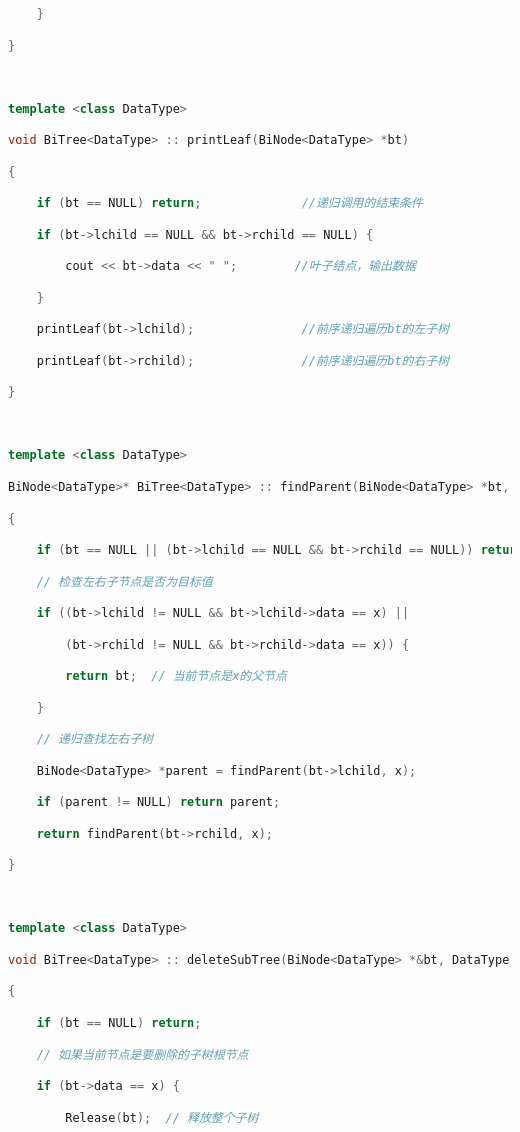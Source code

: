 \begin{lstlisting}[language=C++]
    }

}

  

template <class DataType>

void BiTree<DataType> :: printLeaf(BiNode<DataType> *bt)

{

    if (bt == NULL) return;              //递归调用的结束条件

    if (bt->lchild == NULL && bt->rchild == NULL) {

        cout << bt->data << " ";        //叶子结点，输出数据

    }

    printLeaf(bt->lchild);               //前序递归遍历bt的左子树

    printLeaf(bt->rchild);               //前序递归遍历bt的右子树

}

  

template <class DataType>

BiNode<DataType>* BiTree<DataType> :: findParent(BiNode<DataType> *bt, DataType x)

{

    if (bt == NULL || (bt->lchild == NULL && bt->rchild == NULL)) return NULL;

    // 检查左右子节点是否为目标值

    if ((bt->lchild != NULL && bt->lchild->data == x) ||

        (bt->rchild != NULL && bt->rchild->data == x)) {

        return bt;  // 当前节点是x的父节点

    }

    // 递归查找左右子树

    BiNode<DataType> *parent = findParent(bt->lchild, x);

    if (parent != NULL) return parent;

    return findParent(bt->rchild, x);

}

  

template <class DataType>

void BiTree<DataType> :: deleteSubTree(BiNode<DataType> *&bt, DataType x)

{

    if (bt == NULL) return;

    // 如果当前节点是要删除的子树根节点

    if (bt->data == x) {

        Release(bt);  // 释放整个子树


\end{lstlisting}
